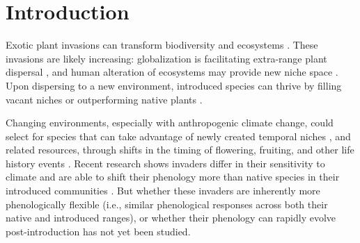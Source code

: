 \documentclass[11pt]{article}\usepackage[]{graphicx}\usepackage[]{color}
\begin{document}
	\section{Introduction} 
	Exotic plant invasions  can transform biodiversity and ecosystems \parencite{Bellard2016, Pejchar2009,Mack2000}. %
These invasions are likely increasing: globalization is facilitating extra-range plant dispersal \parencite{Helmus2014}, and human alteration of ecosystems may provide new niche space \parencite{Tilman2001, Blois2013,Inouye2008,Harte2015}. Upon dispersing to a new environment, introduced species can thrive by filling vacant niches \parencite{Elton1958} or outperforming native plants %
\parencite{Davis2001,Daehler2003}. 

Changing environments, especially with anthropogenic climate change, could select for species that can take advantage of newly created temporal niches \parencite{Wolkovich2011,godoy2014}, and related resources, through shifts in the timing of flowering, fruiting, and other life history events \parencite{Franks2007}. Recent research shows invaders differ in their sensitivity to climate \parencite{Reeb2020} and are able to shift their phenology more than native species in their introduced communities \parencite{Wolkovich2014,Reeb2020,Zettlemoyer2019}. But whether these invaders are inherently more phenologically flexible (i.e., similar phenological responses across both their native and introduced ranges), or whether their phenology can rapidly evolve post-introduction has not yet been studied.%
\end{document}
